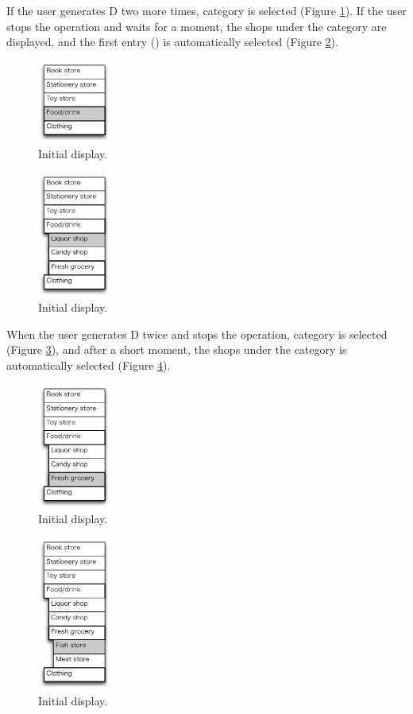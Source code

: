\documentclass{article}
\begin{document}
If the user generates D two more times, 
 category is selected (Figure \ref{fig4}).
If the user stops the operation and waits for a moment, the shops under the 
category are displayed, and the first entry () is automatically selected (Figure \ref{fig5}).

\begin{figure}[H]
\centerline{\includegraphics[width=24mm,bb=0 0 139 157]{figures/fig4.pdf}}
\caption{Initial display.}
\label{fig4}
\end{figure}

\begin{figure}[H]
\centerline{\includegraphics[width=24mm,bb=0 0 139 238]{figures/fig5.pdf}}
\caption{Initial display.}
\label{fig5}
\end{figure}

When the user generates D twice and stops the operation,
 category is selected (Figure \ref{fig6}), and
after a short moment,
the shops under the category is automatically selected (Figure \ref{fig7}).

\begin{figure}[H]
\centerline{\includegraphics[width=24mm,bb=0 0 139 238]{figures/fig6.pdf}}
\caption{Initial display.}
\label{fig6}
\end{figure}

\begin{figure}[H]
\centerline{\includegraphics[width=24mm,bb=0 0 139 292]{figures/fig7.pdf}}
\caption{Initial display.}
\label{fig7}
\end{figure}
\end{document}

